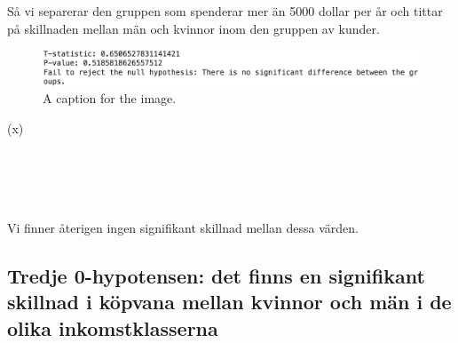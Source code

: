 \documentclass[]{article}
\begin{document}
\fi
Så vi separerar den gruppen som spenderar mer än 5000 dollar per år och tittar på skillnaden mellan män och kvinnor inom den gruppen av kunder.
\begin{figure}[h]
    \centering
    \includegraphics[width=\textwidth]{img_spenderarklassen.png}
    \caption{A caption for the image.}
\end{figure}
\if(x)
\\\\\\\\
\fi
Vi finner återigen ingen signifikant skillnad mellan dessa värden.

\subsection{Tredje 0-hypotensen: det finns en signifikant skillnad i köpvana mellan kvinnor och män i de olika inkomstklasserna}
\end{document}
